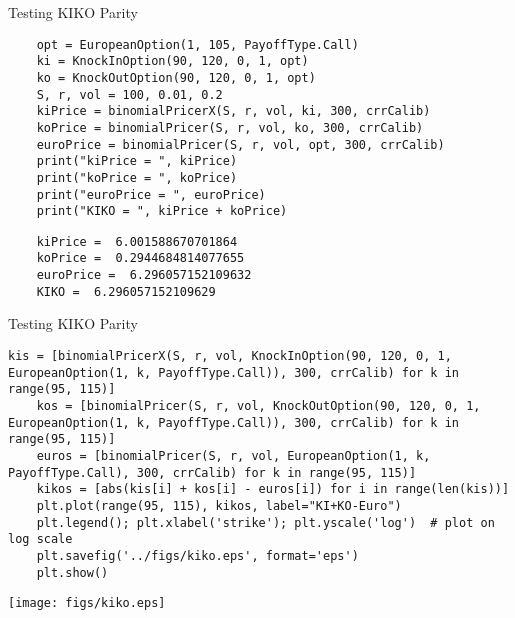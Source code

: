 \begin{frame}[fragile]{Testing KIKO Parity}
\begin{lstlisting}
    opt = EuropeanOption(1, 105, PayoffType.Call)
    ki = KnockInOption(90, 120, 0, 1, opt)
    ko = KnockOutOption(90, 120, 0, 1, opt)
    S, r, vol = 100, 0.01, 0.2
    kiPrice = binomialPricerX(S, r, vol, ki, 300, crrCalib)
    koPrice = binomialPricer(S, r, vol, ko, 300, crrCalib)
    euroPrice = binomialPricer(S, r, vol, opt, 300, crrCalib)
    print("kiPrice = ", kiPrice)
    print("koPrice = ", koPrice)
    print("euroPrice = ", euroPrice)
    print("KIKO = ", kiPrice + koPrice)
\end{lstlisting}
\begin{verbatim}
    kiPrice =  6.001588670701864
    koPrice =  0.2944684814077655
    euroPrice =  6.296057152109632
    KIKO =  6.296057152109629
\end{verbatim}
\end{frame}

\begin{frame}[fragile]{Testing KIKO Parity}
\begin{lstlisting}[style=compactlst]
    kis = [binomialPricerX(S, r, vol, KnockInOption(90, 120, 0, 1, EuropeanOption(1, k, PayoffType.Call)), 300, crrCalib) for k in range(95, 115)]
    kos = [binomialPricer(S, r, vol, KnockOutOption(90, 120, 0, 1, EuropeanOption(1, k, PayoffType.Call)), 300, crrCalib) for k in range(95, 115)]
    euros = [binomialPricer(S, r, vol, EuropeanOption(1, k, PayoffType.Call), 300, crrCalib) for k in range(95, 115)]
    kikos = [abs(kis[i] + kos[i] - euros[i]) for i in range(len(kis))]
    plt.plot(range(95, 115), kikos, label="KI+KO-Euro")
    plt.legend(); plt.xlabel('strike'); plt.yscale('log')  # plot on log scale
    plt.savefig('../figs/kiko.eps', format='eps')
    plt.show()
\end{lstlisting}
\vspace{-3mm}
\begin{center}
\texttt{[image: figs/kiko.eps]}
\end{center}
\end{frame}

